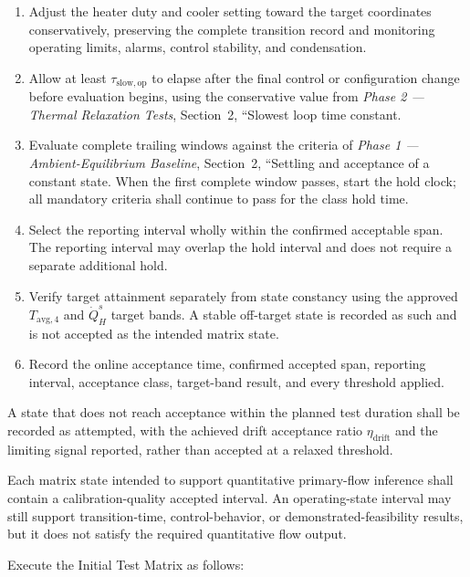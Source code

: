 \documentclass[11pt]{article}
\newcommand{\Tavg}{T_{\mathrm{avg},4}}
\newcommand{\QHs}{\dot Q_{H}^{s}}
\newcommand{\PhaseOneDoc}{\textit{Phase 1 --- Ambient-Equilibrium Baseline}}
\newcommand{\PhaseTwoDoc}{\textit{Phase 2 --- Thermal Relaxation Tests}}
\begin{document}
\begin{enumerate}[label=(\alph*),leftmargin=1.9em,itemsep=2pt,topsep=3pt]
    \item Adjust the heater duty and cooler setting toward the target coordinates conservatively, preserving the complete transition record and monitoring operating limits, alarms, control stability, and condensation.
    \item Allow at least $\tau_{\mathrm{slow,op}}$ to elapse after the final control or configuration change before evaluation begins, using the conservative value from \PhaseTwoDoc, Section~2, ``Slowest loop time constant.
    \item Evaluate complete trailing windows against the criteria of \PhaseOneDoc, Section~2, ``Settling and acceptance of a constant state. When the first complete window passes, start the hold clock; all mandatory criteria shall continue to pass for the class hold time.
    \item Select the reporting interval wholly within the confirmed acceptable span. The reporting interval may overlap the hold interval and does not require a separate additional hold.
    \item Verify target attainment separately from state constancy using the approved $\Tavg$ and $\QHs$ target bands. A stable off-target state is recorded as such and is not accepted as the intended matrix state.
    \item Record the online acceptance time, confirmed accepted span, reporting interval, acceptance class, target-band result, and every threshold applied.
\end{enumerate}

A state that does not reach acceptance within the planned test duration shall be recorded as attempted, with the achieved drift acceptance ratio $\eta_{\mathrm{drift}}$ and the limiting signal reported, rather than accepted at a relaxed threshold.

Each matrix state intended to support quantitative primary-flow inference shall contain a calibration-quality accepted interval. An operating-state interval may still support transition-time, control-behavior, or demonstrated-feasibility results, but it does not satisfy the required quantitative flow output.

Execute the Initial Test Matrix as follows:
\end{document}
